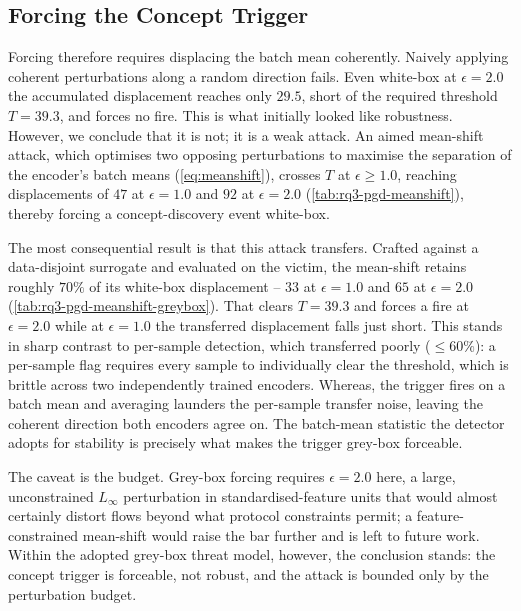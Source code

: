 \subsection{Forcing the Concept Trigger}
\label{sec:eval-rq3-force}
Forcing therefore requires displacing the batch mean coherently. Naively applying coherent perturbations along a random direction fails. Even white-box at $\epsilon = 2.0$ the accumulated displacement reaches only $29.5$, short of the required threshold $T = 39.3$, and forces no fire. This is what initially looked like robustness. However, we conclude that it is not; it is a weak attack. An aimed mean-shift attack, which optimises two opposing perturbations to maximise the separation of the encoder's batch means (\cref{eq:meanshift}), crosses $T$ at $\epsilon \ge 1.0$, reaching displacements of $47$ at $\epsilon = 1.0$ and $92$ at $\epsilon = 2.0$ (\cref{tab:rq3-pgd-meanshift}), thereby forcing a concept-discovery event white-box.



The most consequential result is that this attack transfers. Crafted against a data-disjoint surrogate and evaluated on the victim, the mean-shift retains roughly $70\%$ of its white-box displacement -- $33$ at $\epsilon = 1.0$ and $65$ at $\epsilon = 2.0$ (\cref{tab:rq3-pgd-meanshift-greybox}). That clears $T = 39.3$ and forces a fire at $\epsilon = 2.0$ while at $\epsilon = 1.0$ the transferred displacement falls just short. This stands in sharp contrast to per-sample detection, which transferred poorly ($\le 60\%$): a per-sample flag requires every sample to individually clear the threshold, which is brittle across two independently trained encoders. Whereas, the trigger fires on a batch mean and averaging launders the per-sample transfer noise, leaving the coherent direction both encoders agree on. The batch-mean statistic the detector adopts for stability is precisely what makes the trigger grey-box forceable.



The caveat is the budget. Grey-box forcing requires $\epsilon = 2.0$ here, a large, unconstrained $L_\infty$ perturbation in standardised-feature units that would almost certainly distort flows beyond what protocol constraints permit; a feature-constrained mean-shift would raise the bar further and is left to future work. Within the adopted grey-box threat model, however, the conclusion stands: the concept trigger is forceable, not robust, and the attack is bounded only by the perturbation budget.


